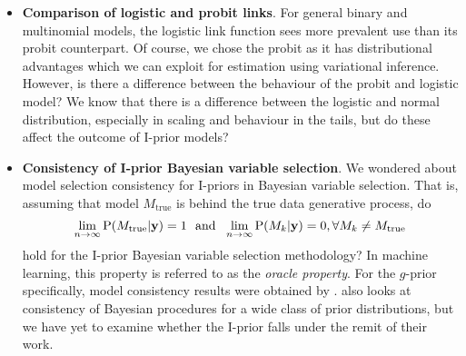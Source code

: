 \documentclass[showframe,11pt,twoside,openright]{report}
\begin{document}
\begin{itemize}
  \item \textbf{Comparison of logistic and probit links}.
  For general binary and multinomial models, the logistic link function sees more prevalent use than its probit counterpart.
  Of course, we chose the probit as it has distributional advantages which we can exploit for estimation using variational inference.
  However, is there a difference between the behaviour of the probit and logistic model?
  We know that there is a difference between the logistic and normal distribution, especially in scaling and behaviour in the tails, but do these affect the outcome of I-prior models?
  
  \item \textbf{Consistency of I-prior Bayesian variable selection}.
  We wondered about model selection consistency for I-priors in Bayesian variable selection.
  That is, assuming that model $M_\text{true}$ is behind the true data generative process, do
  \[
    \lim_{n\to\infty} \operatorname{P}(M_\text{true}|{\mathbf y}) = 1
    \ \ \text{and} \ \
    \lim_{n\to\infty} \operatorname{P}(M_k|{\mathbf y}) = 0, \forall M_k \neq M_\text{true}
  \]
  hold for the I-prior Bayesian variable selection methodology?
  In machine learning, this property is referred to as the \emph{oracle property}.
  For the $g$-prior specifically, model consistency results were obtained by \citet{fernandez2001benchmark,liang2008mixtures}.
  \citet{casella2009consistency} also looks at consistency of Bayesian procedures for a wide class of prior distributions, but we have yet to examine whether the I-prior falls under the remit of their work.
  
\end{itemize}
\end{document}

